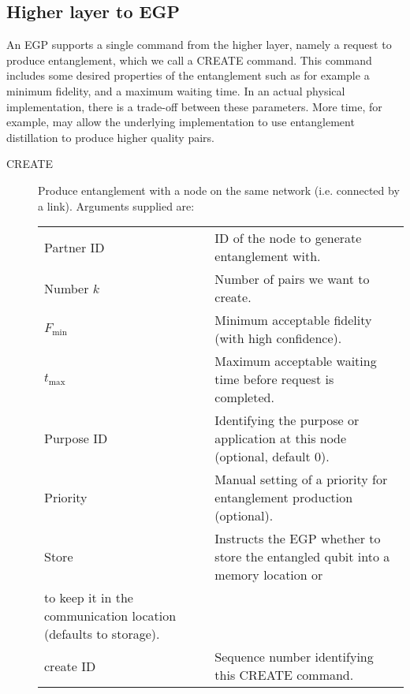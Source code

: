 \documentclass{article}
\begin{document}
\subsection{Higher layer to EGP}
An EGP supports a single command from the higher layer, namely a request to produce entanglement, which we call a CREATE command.
This command includes some desired properties of the entanglement such as for example a minimum fidelity, and a maximum waiting time.
In an actual physical implementation, there is a trade-off between these parameters. More time, for example, may allow the underlying
implementation to use entanglement distillation to produce higher quality pairs.
\begin{description}
\item[CREATE] Produce entanglement with a node on the same network (i.e. connected by a link). Arguments supplied are:\\
\noindent
\begin{tabular}{ll}
Partner ID & ID of the node to generate entanglement with. \\
Number $k$ & Number of pairs we want to create.\\
$F_{\min}$ & Minimum acceptable fidelity (with high confidence). \\
$t_{\max}$ & Maximum acceptable waiting time before request is completed. \\
Purpose ID & Identifying the purpose or application at this node (optional, default 0). \\
Priority & Manual setting of a priority for entanglement production (optional).\\
Store & Instructs the EGP whether to store the entangled qubit into a memory location or \\
to keep it in the communication location (defaults to storage). \\
create ID & Sequence number identifying this CREATE command.
\end{tabular}
\end{description}
\end{document}
